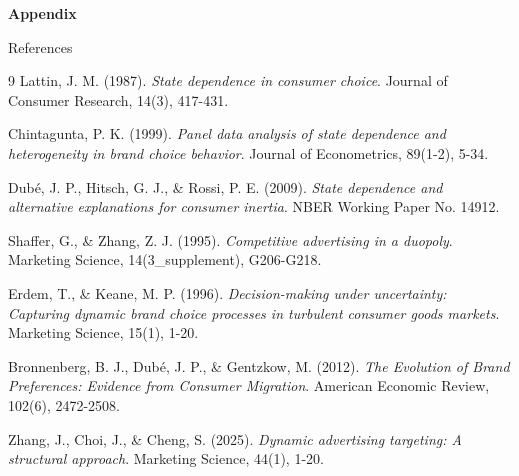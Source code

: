 \documentclass[aspectratio=169,professionalfonts]{beamer}
\begin{document}
\appendix
\begin{frame}
  \centering
  \vspace{2cm}
  {\Large \textbf{Appendix}}
\end{frame}

\begin{frame}{References}
  \begin{thebibliography}{9}
    \footnotesize
    Lattin, J. M. (1987). \textit{State dependence in consumer choice}. Journal of Consumer Research, 14(3), 417-431.

    Chintagunta, P. K. (1999). \textit{Panel data analysis of state dependence and heterogeneity in brand choice behavior}. Journal of Econometrics, 89(1-2), 5-34.

    Dub\'e, J. P., Hitsch, G. J., \& Rossi, P. E. (2009). \textit{State dependence and alternative explanations for consumer inertia}. NBER Working Paper No. 14912.

    Shaffer, G., \& Zhang, Z. J. (1995). \textit{Competitive advertising in a duopoly}. Marketing Science, 14(3_supplement), G206-G218.

    Erdem, T., \& Keane, M. P. (1996). \textit{Decision-making under uncertainty: Capturing dynamic brand choice processes in turbulent consumer goods markets}. Marketing Science, 15(1), 1-20. 

    Bronnenberg, B. J., Dub\'e, J. P., \& Gentzkow, M. (2012). \textit{The Evolution of Brand Preferences: Evidence from Consumer Migration}. American Economic Review, 102(6), 2472-2508.

    Zhang, J., Choi, J., \& Cheng, S. (2025). \textit{Dynamic advertising targeting: A structural approach}. Marketing Science, 44(1), 1-20.

  \end{thebibliography}
\end{frame}
\end{document}
